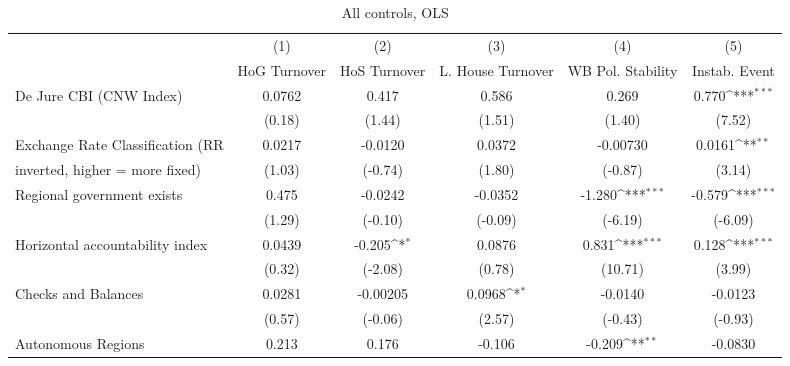 \begin{table}[htbp]\centering
\def\sym#1{\ifmmode^{#1}\else\(^{#1}\)\fi}
\caption{All controls, OLS \label{fullcmultIndOLSDJ}}
\begin{tabular}{l*{5}{c}}
\toprule
                                        &\multicolumn{1}{c}{(1)}&\multicolumn{1}{c}{(2)}&\multicolumn{1}{c}{(3)}&\multicolumn{1}{c}{(4)}&\multicolumn{1}{c}{(5)}\\
                                        &\multicolumn{1}{c}{HoG Turnover}&\multicolumn{1}{c}{HoS Turnover}&\multicolumn{1}{c}{L. House Turnover}&\multicolumn{1}{c}{WB Pol. Stability}&\multicolumn{1}{c}{Instab. Event}\\
\midrule
De Jure CBI (CNW Index)                 &   0.0762         &    0.417         &    0.586         &    0.269         &    0.770\sym{***}\\
                                        &   (0.18)         &   (1.44)         &   (1.51)         &   (1.40)         &   (7.52)         \\
\addlinespace
Exchange Rate Classification (RR        &   0.0217         &  -0.0120         &   0.0372         & -0.00730         &   0.0161\sym{**} \\
inverted, higher = more fixed)          &   (1.03)         &  (-0.74)         &   (1.80)         &  (-0.87)         &   (3.14)         \\
\addlinespace
Regional government exists              &    0.475         &  -0.0242         &  -0.0352         &   -1.280\sym{***}&   -0.579\sym{***}\\
                                        &   (1.29)         &  (-0.10)         &  (-0.09)         &  (-6.19)         &  (-6.09)         \\
\addlinespace
Horizontal accountability index         &   0.0439         &   -0.205\sym{*}  &   0.0876         &    0.831\sym{***}&    0.128\sym{***}\\
                                        &   (0.32)         &  (-2.08)         &   (0.78)         &  (10.71)         &   (3.99)         \\
\addlinespace
Checks and Balances                     &   0.0281         & -0.00205         &   0.0968\sym{*}  &  -0.0140         &  -0.0123         \\
                                        &   (0.57)         &  (-0.06)         &   (2.57)         &  (-0.43)         &  (-0.93)         \\
\addlinespace
Autonomous Regions                      &    0.213         &    0.176         &   -0.106         &   -0.209\sym{**} &  -0.0830         \\

\end{tabular}
\end{table}

